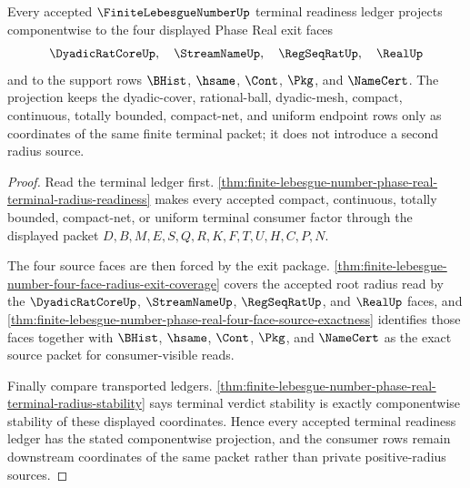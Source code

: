 \begin{theorem}
\label{thm:finite-lebesgue-number-terminal-readiness-face-projection}
Every accepted $\FiniteLebesgueNumberUp$ terminal readiness ledger projects componentwise to the four displayed Phase Real exit faces
$$
\DyadicRatCoreUp,\quad \StreamNameUp,\quad \RegSeqRatUp,\quad \RealUp
$$
and to the support rows $\BHist$, $\hsame$, $\Cont$, $\Pkg$, and $\NameCert$. The projection keeps the dyadic-cover, rational-ball, dyadic-mesh, compact, continuous, totally bounded, compact-net, and uniform endpoint rows only as coordinates of the same finite terminal packet; it does not introduce a second radius source.
\end{theorem}
\begin{proof}
Read the terminal ledger first. \autoref{thm:finite-lebesgue-number-phase-real-terminal-radius-readiness} makes every accepted compact, continuous, totally bounded, compact-net, or uniform terminal consumer factor through the displayed packet $D,B,M,E,S,Q,R,K,F,T,U,H,C,P,N$.

The four source faces are then forced by the exit package. \autoref{thm:finite-lebesgue-number-four-face-radius-exit-coverage} covers the accepted root radius read by the $\DyadicRatCoreUp$, $\StreamNameUp$, $\RegSeqRatUp$, and $\RealUp$ faces, and \autoref{thm:finite-lebesgue-number-phase-real-four-face-source-exactness} identifies those faces together with $\BHist$, $\hsame$, $\Cont$, $\Pkg$, and $\NameCert$ as the exact source packet for consumer-visible reads.

Finally compare transported ledgers. \autoref{thm:finite-lebesgue-number-phase-real-terminal-radius-stability} says terminal verdict stability is exactly componentwise stability of these displayed coordinates. Hence every accepted terminal readiness ledger has the stated componentwise projection, and the consumer rows remain downstream coordinates of the same packet rather than private positive-radius sources.
\end{proof}


